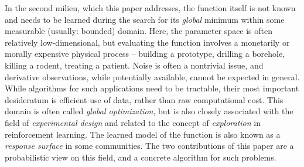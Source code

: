 \documentclass[twoside,11pt]{article}
\begin{document}
In the second milieu, which this paper addresses, the function itself
is not known and needs to be learned during the search for its
\emph{global} minimum within some measurable (usually: bounded)
domain. Here, the parameter space is often relatively low-dimensional,
but evaluating the function involves a monetarily or morally expensive
physical process -- building a prototype, drilling a borehole, killing
a rodent, treating a patient. Noise is often a nontrivial issue, and
derivative observations, while potentially available, cannot be
expected in general. While algorithms for such applications need to be
tractable, their most important desideratum is efficient use of data,
rather than raw computational cost. This domain is often called
\emph{global optimization}, but is also closely associated with the
field of \emph{experimental design} and related to the concept of
\emph{exploration} in reinforcement learning. The learned model of the
function is also known as a \emph{response surface} in some
communities. The two contributions of this paper are a probabilistic
view on this field, and a concrete algorithm for such problems.
\end{document}
